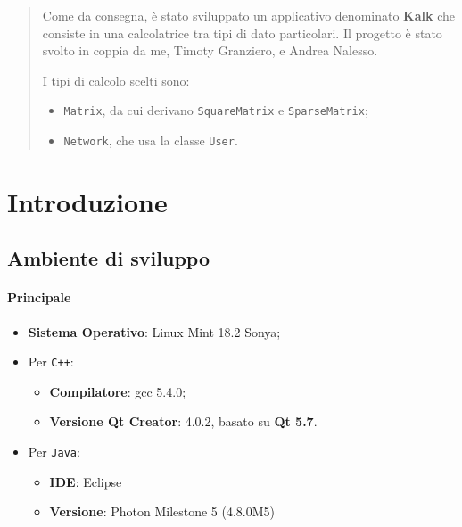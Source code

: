 \begin{abstract} 
    Come da consegna, è stato sviluppato un applicativo denominato \textbf{Kalk} che consiste 
    in una calcolatrice tra tipi di dato particolari. Il progetto è stato svolto in coppia da me,
    Timoty Granziero, e Andrea Nalesso. \par
    I tipi di calcolo scelti sono:
    \begin{itemize}
        \item \texttt{Matrix}, da cui derivano \texttt{SquareMatrix}
        e \texttt{SparseMatrix};
        \item \texttt{Network}, che usa la classe \texttt{User}.
    \end{itemize}
\end{abstract}

\section{Introduzione}

\subsection{Ambiente di sviluppo}
\paragraph*{Principale}
\begin{itemize}
    \item \textbf{Sistema Operativo}: Linux Mint 18.2 Sonya;
    \item Per \texttt{C++}:
    \begin{itemize}
        \item \textbf{Compilatore}: gcc 5.4.0;
        \item \textbf{Versione Qt Creator}: 4.0.2, basato su \textbf{Qt 5.7}.            
    \end{itemize}
    \item Per \texttt{Java}:
    \begin{itemize}
        \item \textbf{IDE}: Eclipse 
        \item \textbf{Versione}: Photon Milestone 5 (4.8.0M5)
    \end{itemize}
\end{itemize}

